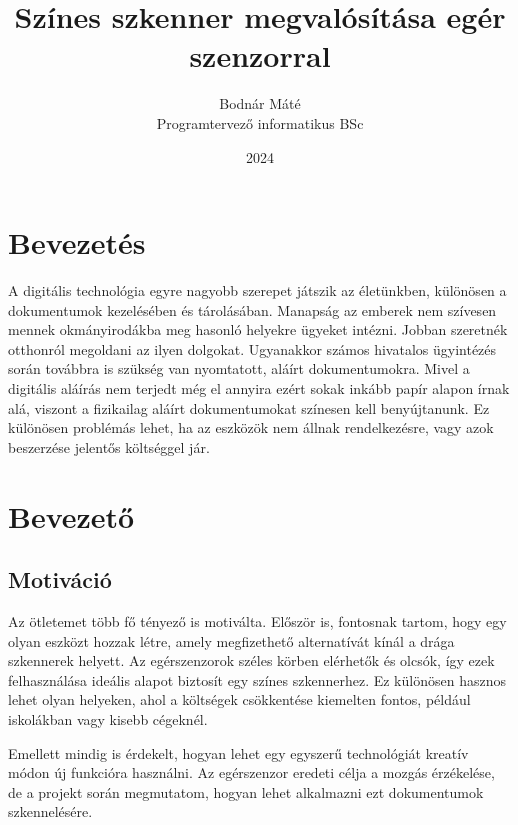 \documentclass[]{thesis-ekf}
\theoremstyle{definition}
\theoremstyle{remark}
\begin{document}
\title{Színes szkenner megvalósítása egér szenzorral}
\author{Bodnár Máté\\Programtervező informatikus BSc}
\date{2024}
\maketitle

\tableofcontents

\chapter*{Bevezetés}
A digitális technológia egyre nagyobb szerepet játszik az életünkben, különösen a dokumentumok kezelésében és tárolásában. Manapság az emberek nem szívesen mennek okmányirodákba meg hasonló helyekre ügyeket intézni. Jobban szeretnék otthonról megoldani az ilyen dolgokat. Ugyanakkor számos hivatalos ügyintézés során továbbra is szükség van nyomtatott, aláírt dokumentumokra. Mivel a digitális aláírás nem terjedt még el annyira ezért sokak inkább papír alapon írnak alá, viszont a fizikailag aláírt dokumentumokat színesen kell benyújtanunk. Ez különösen problémás lehet, ha az eszközök nem állnak rendelkezésre, vagy azok beszerzése jelentős költséggel jár.

\chapter{Bevezető}

\section{Motiváció}
Az ötletemet több fő tényező is motiválta. Először is, fontosnak tartom, hogy egy olyan eszközt hozzak létre, amely megfizethető alternatívát kínál a drága szkennerek helyett. Az egérszenzorok széles körben elérhetők és olcsók, így ezek felhasználása ideális alapot biztosít egy színes szkennerhez. Ez különösen hasznos lehet olyan helyeken, ahol a költségek csökkentése kiemelten fontos, például iskolákban vagy kisebb cégeknél.

Emellett mindig is érdekelt, hogyan lehet egy egyszerű technológiát kreatív módon új funkcióra használni. Az egérszenzor eredeti célja a mozgás érzékelése, de a projekt során megmutatom, hogyan lehet alkalmazni ezt dokumentumok szkennelésére.
\end{document}
